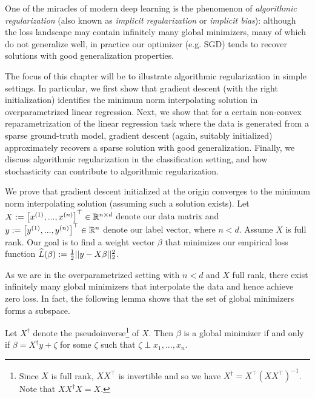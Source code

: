\setcounter{section}{0}


One of the miracles of modern deep learning is the phenomenon of \textit{algorithmic regularization} (also known as \textit{implicit regularization} or \textit{implicit bias}): although the loss landscape may contain infinitely many global minimizers, many of which do not generalize well, in practice our optimizer (e.g. SGD) tends to recover solutions with good generalization properties.

The focus of this chapter will be to illustrate algorithmic regularization in simple settings. In particular, we first show that gradient descent (with the right initialization) identifies the minimum norm interpolating solution in overparametrized linear regression. Next, we show that for a certain non-convex reparametrization of the linear regression task where the data is generated from a sparse ground-truth model, gradient descent (again, suitably initialized) approximately recovers a sparse solution with good generalization. Finally, we discuss algorithmic regularization in the classification setting, and how stochasticity can contribute to algorithmic regularization.

\label{lec13:sec:olr}
We prove that gradient descent initialized at the origin converges to the minimum norm interpolating solution (assuming such a solution exists). Let $X:= \left[x^{(1)},...,x^{(n)} \right]^\top \in \mathbb R^{n \times d}$ denote our data matrix and $y:= \left[y^{(1)},...,y^{(n)} \right]^\top \in \mathbb R^n$ denote our label vector, where $n < d$. Assume $X$ is full rank. Our goal is to find a weight vector $\beta$ that minimizes our empirical loss function $\widehat{L} (\beta) := \frac{1}{2}||y - X\beta||_2^2$.

As we are in the overparametrized setting with $n < d$ and $X$ full rank, there exist infinitely many global minimizers that interpolate the data and hence achieve zero loss. In fact, the following lemma shows that the set of global minimizers forms a subspace.

\begin{lemma}\label{lec13:lem:soln-subspace}
Let $X^\dagger$ denote the pseudoinverse\footnote{Since $X$ is full rank, $XX^\top$ is invertible and so we have $X^\dagger = X^\top (X X^\top)^{-1}$. Note that $X X^\dagger X = X$.} of $X$. Then $\beta$ is a global minimizer if and only if $\beta = X^\dagger y + \zeta$ for some $\zeta$ such that $\zeta \perp x_1,...,x_n$.
\end{lemma}

